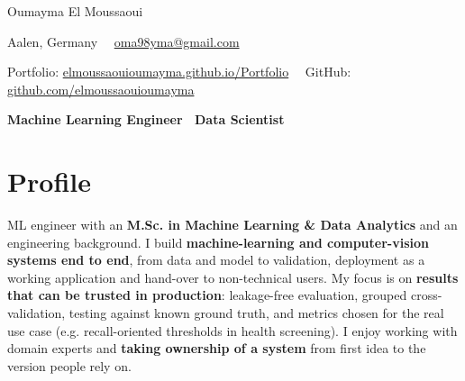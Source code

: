 \documentclass[10pt,a4paper]{article}
\newcommand{\sep}{\ \textbar\ }
\begin{document}
\begin{center}
  {\fontsize{24}{28}\selectfont Oumayma El Moussaoui}\par\vspace{4pt}
  {\small
  Aalen, Germany\sep
  \href{mailto:oma98yma@gmail.com}{oma98yma@gmail.com}\par
  Portfolio: \href{https://elmoussaouioumayma.github.io/Portfolio/}{elmoussaouioumayma.github.io/Portfolio}\sep
  GitHub: \href{https://github.com/elmoussaouioumayma}{github.com/elmoussaouioumayma}\par}
  \vspace{4pt}
  \textbf{Machine Learning Engineer \textbar\ Data Scientist}\par
\end{center}
\vspace{-6pt}

\section{Profile}
ML engineer with an \textbf{M.Sc. in Machine Learning \& Data Analytics} and an engineering background. I build \textbf{machine-learning and computer-vision systems end to end}, from data and model to validation, deployment as a working application and hand-over to non-technical users. My focus is on \textbf{results that can be trusted in production}: leakage-free evaluation, grouped cross-validation, testing against known ground truth, and metrics chosen for the real use case (e.g. recall-oriented thresholds in health screening). I enjoy working with domain experts and \textbf{taking ownership of a system} from first idea to the version people rely on.

\end{document}
